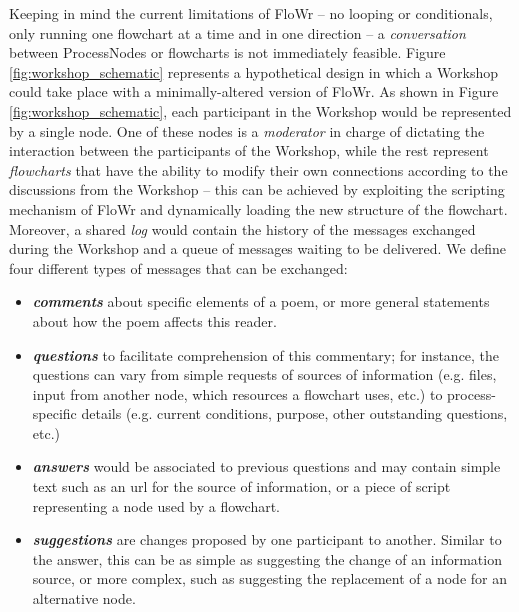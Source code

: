 Keeping in mind the current limitations of FloWr -- no looping or conditionals, only running one flowchart at a time and in one direction -- a {\em conversation} between ProcessNodes or flowcharts is not immediately feasible.  Figure \ref{fig:workshop_schematic} represents a hypothetical design in which a Workshop could take place with a minimally-altered version of FloWr. As shown in Figure \ref{fig:workshop_schematic}, each participant in the Workshop would be represented by a single node. One of these nodes is a {\em moderator} in charge of dictating the interaction between the participants of the Workshop, while the rest represent {\em flowcharts} that have the ability to modify their own connections according to the discussions from the Workshop -- this can be achieved by exploiting the scripting mechanism of FloWr and dynamically loading the new structure of the flowchart. Moreover, a shared \emph{log} would contain the history of the messages exchanged during the Workshop and a queue of messages waiting to be delivered. We define four different types of messages that can be exchanged:
\begin{itemize}
\item {\bf\em comments} about specific elements of a poem, or more general statements about how the poem affects this reader.
\item {\bf\em questions} to facilitate comprehension of this commentary; for instance, the questions can vary from simple requests of sources of information (e.g. files, input from another node, which resources a flowchart uses, etc.) to process-specific details (e.g. current conditions, purpose, other outstanding questions, etc.)
\item {\bf\em answers} would be associated to previous questions and may contain simple text such as an url for the source of information, or a piece of script representing a node used by a flowchart.
\item {\bf\em suggestions} are changes proposed by one participant to another. Similar to the answer, this can be as simple as suggesting the change of an information source, or more complex, such as suggesting the replacement of a node for an alternative node.
\end{itemize}

